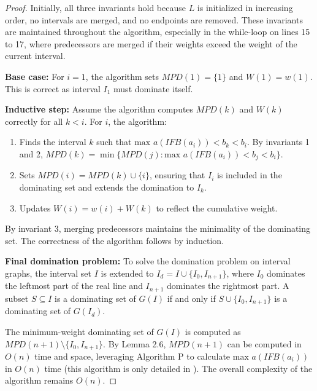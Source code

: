 \documentclass{article}
\begin{document}
\begin{proof}
    Initially, all three invariants hold because $L$ is initialized in increasing order, no intervals are merged, and no endpoints are removed. These invariants are maintained throughout the algorithm, especially in the while-loop on lines 15 to 17, where predecessors are merged if their weights exceed the weight of the current interval.
    
    \bigskip
    
    \textbf{Base case:}  
    For $i = 1$, the algorithm sets $MPD(1) = \{1\}$ and $W(1) = w(1)$. This is correct as interval $I_1$ must dominate itself.
    
    \bigskip
    
    \textbf{Inductive step:}  
    Assume the algorithm computes $MPD(k)$ and $W(k)$ correctly for all $k < i$. For $i$, the algorithm:
    \begin{enumerate}
        \item Finds the interval $k$ such that $\text{max } a(IFB(a_i)) < b_k < b_i$. By invariants 1 and 2, $MPD(k) = \min\{MPD(j) : \text{max } a(IFB(a_i)) < b_j < b_i\}$.
        \item Sets $MPD(i) = MPD(k) \cup \{i\}$, ensuring that $I_i$ is included in the dominating set and extends the domination to $I_k$.
        \item Updates $W(i) = w(i) + W(k)$ to reflect the cumulative weight.
    \end{enumerate}
    
    By invariant 3, merging predecessors maintains the minimality of the dominating set. The correctness of the algorithm follows by induction.
    
    \bigskip
    
    \textbf{Final domination problem:}  
    To solve the domination problem on interval graphs, the interval set $I$ is extended to $I_d = I \cup \{I_0, I_{n+1}\}$, where $I_0$ dominates the leftmost part of the real line and $I_{n+1}$ dominates the rightmost part. A subset $S \subseteq I$ is a dominating set of $G(I)$ if and only if $S \cup \{I_0, I_{n+1}\}$ is a dominating set of $G(I_d)$. 
    
    The minimum-weight dominating set of $G(I)$ is computed as $MPD(n+1) \setminus \{I_0, I_{n+1}\}$. By Lemma 2.6, $MPD(n+1)$ can be computed in $O(n)$ time and space, leveraging Algorithm P to calculate $\text{max } a(IFB(a_i))$ in $O(n)$ time (this algorithm is only detailed in \cite{chang}). The overall complexity of the algorithm remains $O(n)$.

\end{proof}
\end{document}
